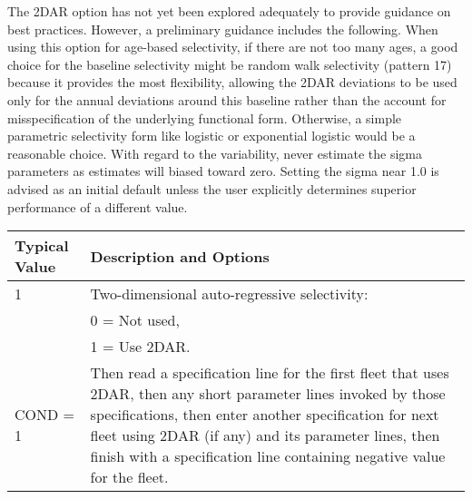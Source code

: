 The 2DAR option has not yet been explored adequately to provide guidance on best practices. However, a preliminary guidance includes the following. When using this option for age-based selectivity, if there are not too many ages, a good choice for the baseline selectivity might be random walk selectivity (pattern 17) because it provides the most flexibility, allowing the 2DAR deviations to be used only for the annual deviations around this baseline rather than the account for misspecification of the underlying functional form. Otherwise, a simple parametric selectivity form like logistic or exponential logistic would be a reasonable choice. With regard to the variability, never estimate the sigma parameters as estimates will biased toward zero. Setting the sigma near 1.0 is advised as an initial default unless the user explicitly determines superior performance of a different value.

\begin{tabular}{p{2cm} p{14cm}}
	\hline
	Typical Value & Description and Options \Tstrut\Bstrut\\
	\hline
	1 \Tstrut & Two-dimensional auto-regressive selectivity: \\
	  & 0 = Not used, \\
	  & 1 = Use 2DAR. \\
	COND = 1 & Then read a specification line for the first fleet that uses 2DAR, then any short parameter lines invoked by those specifications, then enter another specification for next fleet using 2DAR (if any) and its parameter lines, then finish with a specification line containing negative value for the fleet. \Bstrut\\
	\hline
\end{tabular}

